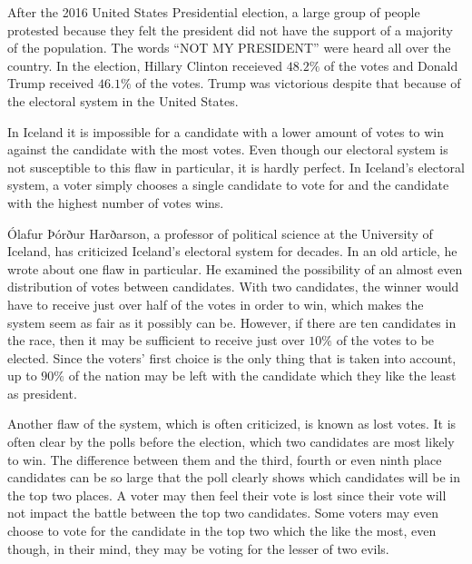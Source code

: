 After the 2016 United States Presidential election, a large group of people protested because they felt the president did not have the support of a majority of the population.
The words ``NOT MY PRESIDENT'' were heard all over the country.
In the election, Hillary Clinton receieved $48.2\%$ of the votes and Donald Trump received $46.1\%$ of the votes.
Trump was victorious despite that because of the electoral system in the United States.

In Iceland it is impossible for a candidate with a lower amount of votes to win against the candidate with the most votes.
Even though our electoral system is not susceptible to this flaw in particular, it is hardly perfect.
In Iceland's electoral system, a voter simply chooses a single candidate to vote for and the candidate with the highest number of votes wins.

Ólafur Þórður Harðarson, a professor of political science at the University of Iceland, has criticized Iceland's electoral system for decades.
In an old article, he wrote about one flaw in particular.
He examined the possibility of an almost even distribution of votes between candidates.
With two candidates, the winner would have to receive just over half of the votes in order to win, which makes the system seem as fair as it possibly can be.
However, if there are ten candidates in the race, then it may be sufficient to receive just over $10\%$ of the votes to be elected.
Since the voters' first choice is the only thing that is taken into account, up to $90\%$ of the nation may be left with the candidate which they like the least as president.

Another flaw of the system, which is often criticized, is known as lost votes.
It is often clear by the polls before the election, which two candidates are most likely to win.
The difference between them and the third, fourth or even ninth place candidates can be so large that the poll clearly shows which candidates will be in the top two places.
A voter may then feel their vote is lost since their vote will not impact the battle between the top two candidates.
Some voters may even choose to vote for the candidate in the top two which the like the most, even though, in their mind, they may be voting for the lesser of two evils.

